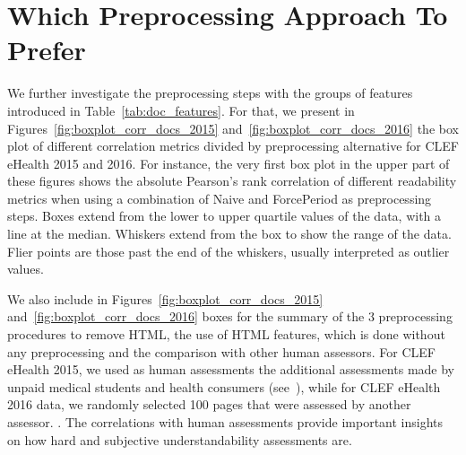 \section{Which Preprocessing Approach To Prefer}
\label{sec:which_preprocessing}

We further investigate the preprocessing steps with the groups of features introduced in Table~\ref{tab:doc_features}.
For that, we present in Figures~\ref{fig:boxplot_corr_docs_2015} and~\ref{fig:boxplot_corr_docs_2016} the box plot of different correlation metrics divided by preprocessing alternative for CLEF eHealth 2015 and 2016. 
For instance, the very first box plot in the upper part of these figures shows the absolute Pearson's rank correlation of different readability metrics when using a combination of Naive and ForcePeriod as preprocessing steps.
Boxes extend from the lower to upper quartile values of the data, with a line at the median. Whiskers extend from the box to show the range of the data. Flier points are those past the end of the whiskers, usually interpreted as outlier values.

We also include in Figures~\ref{fig:boxplot_corr_docs_2015} and~\ref{fig:boxplot_corr_docs_2016} boxes for the summary of the 3 preprocessing procedures to remove HTML, the use of HTML features, which is done without any preprocessing and the comparison with other human assessors. For CLEF eHealth 2015, we used as human assessments the additional assessments made by unpaid medical students and health consumers (see~\cite{palotti16b}), while for CLEF eHealth 2016 data, we randomly selected 100 pages that were assessed by another assessor. .
The correlations with human assessments provide important insights on how hard and subjective understandability assessments are.

